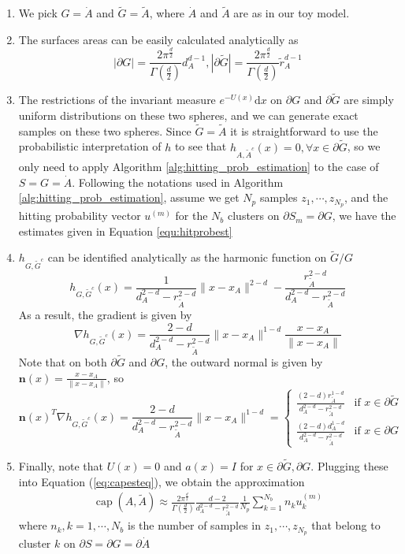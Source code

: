 \documentclass[english, aip, jcp, priprint, graphicx,floatfix]{revtex4-1}
\theoremstyle{plain}
\theoremstyle{definition}
\theoremstyle{plain}
\begin{document}
\begin{enumerate}
    \item We pick $G = \dot{A}$ and $\tilde{G} = \tilde{A}$, where $\dot{A}$ and $\tilde{A}$ are as in our toy model.
    \item The surfaces areas can be easily calculated analytically as
\[|\partial G| = \frac{2\pi^{\frac{d}{2}}}{\Gamma(\frac{d}{2})}d_A^{d - 1}, |\partial \tilde{G}| = \frac{2\pi^{\frac{d}{2}}}{\Gamma(\frac{d}{2})}\tilde{r}_A^{d - 1}\]
    \item The restrictions of the invariant measure $e^{- U (x)} \mathrm{d} x$ on $\partial G$ and $\partial \tilde{G}$ are simply uniform distributions on these two spheres, and we can generate exact samples on these two spheres. Since $\tilde{G} = \tilde{A}$ it is straightforward to use the probabilistic interpretation of $h$ to see that $h_{A, \tilde{A}^c} (x) = 0, \forall x \in \partial \tilde{G}$, so we only need to apply Algorithm \ref{alg:hitting_prob_estimation} to the case of $S=G=\dot{A}$. Following the notations used in Algorithm \ref{alg:hitting_prob_estimation}, assume we get $N_p$ samples $z_1,\cdots, z_{N_p}$, and the hitting probability vector $u^{(m)}$ for the $N_b$ clusters on $\partial S_m = \partial G$, we have the estimates given in Equation \ref{equ:hitprobest}
    \item $h_{G, \tilde{G}^c}$ can be identified analytically as the harmonic function on $\tilde{G} / G$\cite{Wendel1980-sj}
\[ h_{G, \tilde{G}^c} (x) = \frac{1}{d_A^{2 - d} - r_{\tilde{A}}^{2 - d}} \| x
- x_A \|^{2 - d} - \frac{r_{\tilde{A}}^{2 - d}}{d_A^{2 - d} -
r_{\tilde{A}}^{2 - d}} \]
As a result, the gradient is given by
\[ \nabla h_{G, \tilde{G}^c} (x) = \frac{2 - d}{d_A^{2 - d} - r_{\tilde{A}}^{2
   - d}} \| x - x_A \|^{1 - d} \frac{x - x_A}{\| x - x_A \|} \]
Note that on both $\partial \tilde{G}$ and $\partial G$, the outward normal is
given by ${\textbf{n}} (x) = \frac{x - x_A}{\| x - x_A \|}$, so
\[
    {\textbf{n}} (x)^T \nabla h_{G, \tilde{G}^c} (x) = \frac{2 - d}{d_A^{2 - d} - r_{\tilde{A}}^{2 - d}} \| x - x_A \|^{1 - d} = 
\begin{cases}
    \frac{(2 - d) r_{\tilde{A}}^{1 - d}}{d_A^{2 - d} - r_{\tilde{A}}^{2 - d}} & \text{if }x \in \partial \tilde{G}\\
    \frac{(2 - d) d_A^{1 - d}}{d_A^{2 - d} - r_{\tilde{A}}^{2 - d}} & \text{if }x \in \partial G
\end{cases}
\]
\item Finally, note that $U (x) = 0$ and $a (x) = I$ for $x
\in \partial \tilde{G},\partial G$.  Plugging these into Equation (\ref{eq:capesteq}), we obtain the approximation
%
\begin{gather}
    \ensuremath{\operatorname{cap}} (A, \tilde{A}) \approx \frac{2\pi^{\frac{d}{2}}}{\Gamma(\frac{d}{2})}\frac{d-2}{d_A^{2-d}-r_{\tilde A}^{2-d}}\frac{1}{N_p} \sum_{k=1}^{N_b}n_k u_k^{(m)}
\end{gather}
where $n_k, k=1, \cdots, N_b$ is the number of samples in $z_1, \cdots, z_{N_p}$ that belong to cluster $k$ on $\partial S=\partial G=\partial \dot{A}$
%
\end{enumerate}
\end{document}
